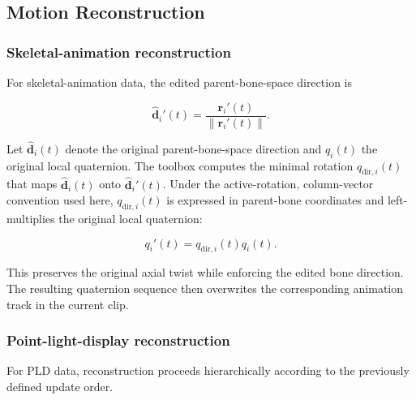\documentclass[12pt]{article}
\begin{document}


\subsection{Motion Reconstruction}
\label{sup:reconstruction}

\subsubsection{Skeletal-animation reconstruction}
\label{sup:skeletal-reconstruction}

For skeletal-animation data, the edited parent-bone-space direction is

\begin{equation}
\hat{\mathbf{d}}_i'(t)
=
\frac{
\mathbf{r}_i'(t)
}{
\left\|
\mathbf{r}_i'(t)
\right\|
}.
\label{eq:sup-edited-direction}
\end{equation}

Let $\hat{\mathbf{d}}_i(t)$ denote the original parent-bone-space
direction and $q_i(t)$ the original local quaternion.
The toolbox computes the minimal rotation
$q_{\mathrm{dir},i}(t)$ that maps
$\hat{\mathbf{d}}_i(t)$ onto
$\hat{\mathbf{d}}_i'(t)$. Under the active-rotation, column-vector
convention used here, $q_{\mathrm{dir},i}(t)$ is expressed in parent-bone
coordinates and left-multiplies the original local quaternion:

\begin{equation}
q_i'(t)
=
q_{\mathrm{dir},i}(t)
q_i(t).
\label{eq:sup-quaternion-update}
\end{equation}

This preserves the original axial twist while enforcing the edited bone
direction. The resulting quaternion sequence then overwrites the
corresponding animation track in the current clip.


\subsubsection{Point-light-display reconstruction}
\label{sup:pld-reconstruction}

For PLD data, reconstruction proceeds hierarchically according to the
previously defined update order.
\end{document}
